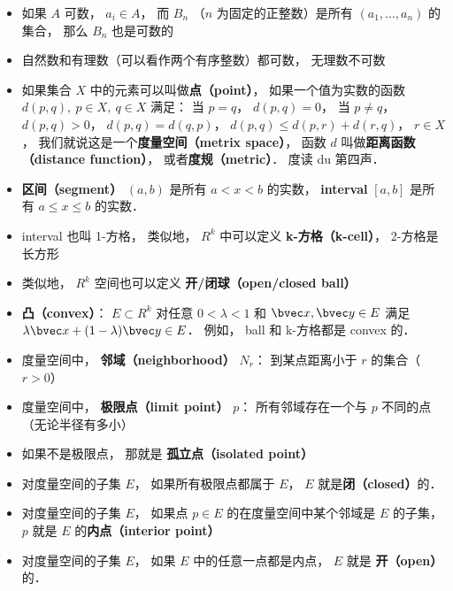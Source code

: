 \begin{itemize}
\item 如果 $A$ 可数， $a_i \in A$，  而 $B_n$ （$n$ 为固定的正整数）是所有 $(a_1, \dots, a_n)$ 的集合， 那么 $B_n$ 也是可数的

\item 自然数和有理数（可以看作两个有序整数）都可数， 无理数不可数

\item 如果集合 $X$ 中的元素可以叫做\textbf{点（point）}， 如果一个值为实数的函数 $d(p, q), \ p \in X,\ q \in X$ 满足： 当 $p = q$， $d(p, q) = 0$， 当 $p \ne q$， $d(p, q) > 0$， $d(p, q) = d(q, p)$， $d(p, q) \leqslant d(p, r) + d(r, q)$， $r \in X$， 我们就说这是一个\textbf{度量空间（metrix space）}， 函数 $d$ 叫做\textbf{距离函数（distance function）}， 或者\textbf{度规（metric）}． 度读 du 第四声．

\item \textbf{区间（segment）} $(a, b)$ 是所有 $a < x < b$ 的实数， \textbf{interval} $[a, b]$ 是所有 $a \leqslant x \leqslant b$ 的实数．

\item interval 也叫 1-方格， 类似地， $R^k$ 中可以定义 \textbf{k-方格（k-cell）}， 2-方格是长方形

\item 类似地， $R^k$ 空间也可以定义 \textbf{开/闭球（open/closed ball）}

\item \textbf{凸（convex）}： $E \subset R^k$ 对任意 $0 < \lambda < 1$ 和 $\bvec x, \bvec y \in E$ 满足 $\lambda \bvec x + (1 - \lambda) \bvec y \in E$． 例如， ball 和 k-方格都是 convex 的．

\item 度量空间中， \textbf{邻域（neighborhood）} $N_r$： 到某点距离小于 $r$ 的集合（$r > 0$）

\item 度量空间中， \textbf{极限点（limit point）} $p$： 所有邻域存在一个与 $p$ 不同的点（无论半径有多小）

\item 如果不是极限点， 那就是 \textbf{孤立点（isolated point）}

\item 对度量空间的子集 $E$， 如果所有极限点都属于 $E$， $E$ 就是\textbf{闭（closed）}的．

\item 对度量空间的子集 $E$， 如果点 $p \in E$ 的在度量空间中某个邻域是 $E$ 的子集， $p$ 就是 $E$ 的\textbf{内点（interior point）}

\item 对度量空间的子集 $E$， 如果 $E$ 中的任意一点都是内点， $E$ 就是 \textbf{开（open）} 的．


\end{itemize}
